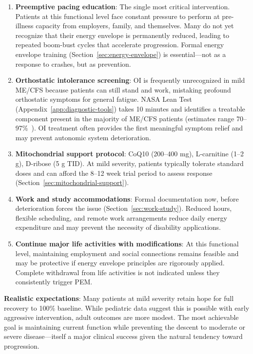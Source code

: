 \begin{enumerate}
    \item \textbf{Preemptive pacing education}: The single most critical intervention. Patients at this functional level face constant pressure to perform at pre-illness capacity from employers, family, and themselves. Many do not yet recognize that their energy envelope is permanently reduced, leading to repeated boom-bust cycles that accelerate progression. Formal energy envelope training (Section~\ref{sec:energy-envelope}) is essential---not as a response to crashes, but as prevention.

    \item \textbf{Orthostatic intolerance screening}: OI is frequently unrecognized in mild ME/CFS because patients can still stand and work, mistaking profound orthostatic symptoms for general fatigue. NASA Lean Test (Appendix~\ref{app:diagnostic-tools}) takes 10 minutes and identifies a treatable component present in the majority of ME/CFS patients (estimates range 70--97\%~\cite{Schondorf1999OI,Rowe2017pediatric}). OI treatment often provides the first meaningful symptom relief and may prevent autonomic system deterioration.

    \item \textbf{Mitochondrial support protocol}: CoQ10 (200--400 mg), L-carnitine (1--2 g), D-ribose (5 g TID). At mild severity, patients typically tolerate standard doses and can afford the 8--12 week trial period to assess response (Section~\ref{sec:mitochondrial-support}).

    \item \textbf{Work and study accommodations}: Formal documentation now, before deterioration forces the issue (Section~\ref{sec:work-study}). Reduced hours, flexible scheduling, and remote work arrangements reduce daily energy expenditure and may prevent the necessity of disability applications.

    \item \textbf{Continue major life activities with modifications}: At this functional level, maintaining employment and social connections remains feasible and may be protective if energy envelope principles are rigorously applied. Complete withdrawal from life activities is not indicated unless they consistently trigger PEM.
\end{enumerate}

\textbf{Realistic expectations}: Many patients at mild severity retain hope for full recovery to 100\% baseline. While pediatric data suggest this is possible with early aggressive intervention, adult outcomes are more modest. The most achievable goal is maintaining current function while preventing the descent to moderate or severe disease---itself a major clinical success given the natural tendency toward progression.


